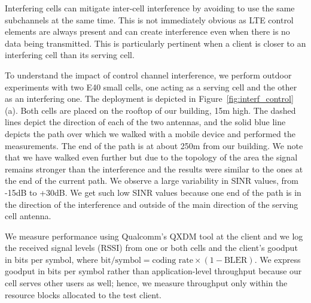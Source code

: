 Interfering cells can mitigate inter-cell interference by avoiding to use the same subchannels at the same time.
This is not immediately obvious as LTE control elements are always present and can create interference 
even when there is no data being transmitted. This is particularly pertinent when a client is closer to an interfering cell than its serving cell. 

To understand the impact of control channel interference, we perform outdoor experiments with two E40 small cells, one acting as a serving cell and the other as an interfering one. 
The deployment is depicted in Figure~\ref{fig:interf_control}(a). 
Both cells are placed on the rooftop of our building, 15m high. The dashed lines depict the direction of each of the two antennas, and the solid blue line depicts the path over which we walked with a mobile device and performed the measurements. The end of the path is at about 250m from our building. We note that we have walked even further but due to the topology of the area the signal remains stronger than the interference and the results were similar to the ones at the end of the current path. We observe a large variability in SINR values, from -15dB to +30dB. We get such low SINR values because one end of the path is in the direction of the interference and outside of the main direction of the serving cell antenna.

We measure performance using Qualcomm's QXDM tool at the client and we log the received signal levels (RSSI) from one or both cells and the client's goodput in bits per symbol, where 
$ \mbox{bit}/\mbox{symbol} = \mbox{coding rate} \times (1-\mbox{BLER})$. 
We express goodput in bits per symbol rather than application-level throughput because our cell serves other users as well; hence, we measure throughput only within the resource blocks allocated to the test client.

